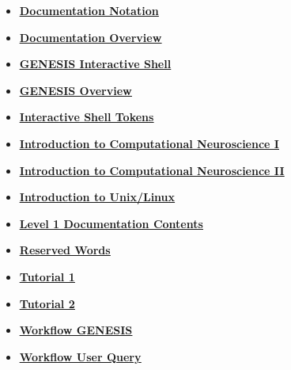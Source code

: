 \documentclass[12pt]{article}
\begin{document}
\begin{itemize}
\item \href{../notation/notation.pdf}{\bf \underline{Documentation Notation}}

\item \href{../documentation-overview/documentation-overview.pdf}{\bf \underline{Documentation Overview}}

\item \href{../gshell/gshell.pdf}{\bf \underline{GENESIS Interactive Shell}}

\item \href{../genesis-overview/genesis-overview.pdf}{\bf \underline{GENESIS Overview}}

\item \href{../shell-tokens/shell-tokens.pdf}{\bf \underline{Interactive Shell Tokens}}

\item \href{../compneurosci-1/compneurosci-1.pdf}{\bf \underline{Introduction to Computational Neuroscience I}}

\item \href{../compneurosci-2/compneurosci-2.pdf}{\bf \underline{Introduction to Computational Neuroscience II}}

\item \href{../unix-linux/unix-linux.pdf}{\bf \underline{Introduction to Unix/Linux}}

\item \href{../contents-level1/contents-level1.pdf}{\bf \underline{Level 1 Documentation Contents}}

\item \href{../reserved-words/reserved-words.pdf}{\bf \underline{Reserved Words}}

\item \href{../tutorial1/tutorial1.pdf}{\bf \underline{Tutorial 1}}

\item \href{../tutorial2/tutorial2.pdf}{\bf \underline{Tutorial 2}}

\item \href{../workflow-genesis/workflow-genesis.pdf}{\bf \underline{Workflow GENESIS}}

\item \href{../workflow-user-query/workflow-user-query.pdf}{\bf \underline{Workflow User Query}}


\end{itemize}

\end{document}
